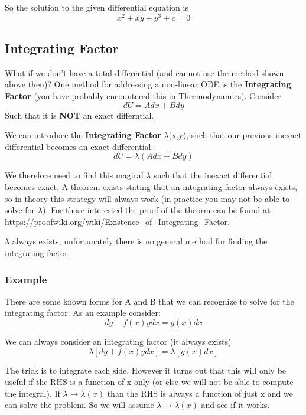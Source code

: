 \documentclass{article}
\newcommand{\be}{\begin{equation}}
\newcommand{\ee}{\end{equation}}
\begin{document}
So the solution to the given differential equation is 
\be
x^2 + xy + y^3 + c = 0
\ee

\subsection*{Integrating Factor}
What if we don't have a total differential (and cannot use the method shown above then)?
One method for addressing a non-linear ODE is the \textbf{Integrating Factor} (you have probably encountered this in Thermodynamics). 
Consider 
\be
dU = Adx + Bdy
\ee
Such that it is \textbf{NOT} an exact differntial.

We can introduce the \textbf{Integrating Factor} $\lambda$(x,y), such that our previous inexact differential becomes an exact differential. 
\be
dU = \lambda(Adx + Bdy)
\ee

We therefore need to find this magical $\lambda$ such that the inexact differential becomes exact.
A theorem exists stating that an integrating factor always exists, so in theory this strategy will always work (in practice you may not be able to solve for $\lambda$). 
For those interested the proof of the theorm can be found at \url{https://proofwiki.org/wiki/Existence_of_Integrating_Factor}. 

$\lambda$ always exists, unfortunately there is no general method for finding the integrating factor.

\subsubsection*{Example}
There are some known forms for A and B that we can recognize to solve for the integrating factor. As an example consider:
\be
dy + f(x) y dx = g(x) dx
\ee

We can always consider an integrating factor (it always exists)
\be
\lambda \left[dy + f(x) y dx\right] = \lambda \left[g(x) dx\right]
\ee

The trick is to integrate each side.
However it turns out that this will only be useful if the RHS is a function of x only (or else we will not be able to compute the integral). 
If $\lambda \rightarrow \lambda(x)$ than the RHS is always a function of just x and we can solve the problem. 
So we will assume $\lambda \rightarrow \lambda(x)$ and see if it works.
\end{document}
